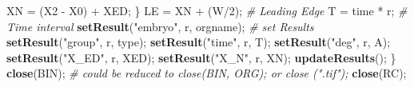 \documentclass[11pt,singlespacinge,twoside]{reedthesis} %
\newenvironment{Shaded}{}{}
\newcommand{\CommentTok}[1]{\textit{#1}}
\newcommand{\DecValTok}[1]{#1}
\newcommand{\KeywordTok}[1]{\textbf{#1}}
\newcommand{\NormalTok}[1]{#1}
\newcommand{\OperatorTok}[1]{#1}
\newcommand{\StringTok}[1]{#1}
\theoremstyle{definition}
\theoremstyle{definition}
\theoremstyle{definition}
\theoremstyle{remark}
\begin{document}
\begin{Shaded}
\begin{Highlighting}[numbers=left,,]
\NormalTok{            XN =}\StringTok{ }\NormalTok{(X2 }\OperatorTok{-}\StringTok{ }\NormalTok{X0) }\OperatorTok{+}\StringTok{ }\NormalTok{XED;}
\NormalTok{        \}}
\NormalTok{        LE =}\StringTok{ }\NormalTok{XN }\OperatorTok{+}\StringTok{ }\NormalTok{(W}\OperatorTok{/}\DecValTok{2}\NormalTok{); }\CommentTok{# Leading Edge }
\NormalTok{        T =}\StringTok{ }\NormalTok{time }\OperatorTok{*}\StringTok{ }\NormalTok{r; }\CommentTok{# Time interval}
        \KeywordTok{setResult}\NormalTok{(}\StringTok{"embryo"}\NormalTok{, r, orgname); }\CommentTok{# set Results}
        \KeywordTok{setResult}\NormalTok{(}\StringTok{"group"}\NormalTok{, r, type);}
        \KeywordTok{setResult}\NormalTok{(}\StringTok{"time"}\NormalTok{, r, T);}
        \KeywordTok{setResult}\NormalTok{(}\StringTok{"deg"}\NormalTok{, r, A);}
        \KeywordTok{setResult}\NormalTok{(}\StringTok{"X_ED"}\NormalTok{, r, XED);}
        \KeywordTok{setResult}\NormalTok{(}\StringTok{"X_N"}\NormalTok{, r, XN);}
        \KeywordTok{updateResults}\NormalTok{();}
\NormalTok{        \}}
        \KeywordTok{close}\NormalTok{(BIN); }\CommentTok{# could be reduced to close(BIN, ORG); or close (".tif");}
        \KeywordTok{close}\NormalTok{(RC);}
        

\end{Highlighting}
\end{Shaded}
\end{document}

